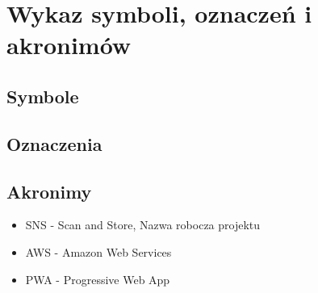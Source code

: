 \documentclass[../main.tex]{subfiles}
\begin{document}
\section{Wykaz symboli, oznaczeń i akronimów}
    \subsection{Symbole}
    \subsection{Oznaczenia}
    \subsection{Akronimy}
        \begin{itemize}
            \item SNS - Scan and Store, Nazwa robocza projektu
            \item AWS - Amazon Web Services
            \item PWA - Progressive Web App
        \end{itemize}
\end{document}
